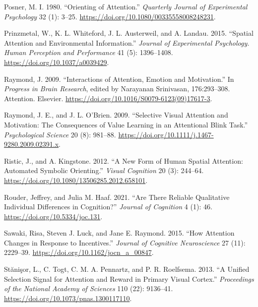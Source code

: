 \documentclass[11pt,halfline,a4paper,]{ouparticle}
\newlength{\cslhangindent}
\newlength{\cslentryspacingunit} %
\newenvironment{CSLReferences}[2] %
 {%
  \setlength{\parindent}{0pt}
  \ifodd #1
  \let\oldpar\par
  \def\par{\hangindent=\cslhangindent\oldpar}
  \fi
  \setlength{\parskip}{#2\cslentryspacingunit}
 }%
 {}
\begin{document}
\begin{CSLReferences}{1}{0}
\leavevmode{}%
Posner, M. I. 1980. {``Orienting of {Attention}.''} \emph{Quarterly Journal of Experimental Psychology} 32 (1): 3--25. \url{https://doi.org/10.1080/00335558008248231}.

\leavevmode{}%
Prinzmetal, W., K. L. Whiteford, J. L. Austerweil, and A. Landau. 2015. {``Spatial Attention and Environmental Information.''} \emph{Journal of Experimental Psychology. Human Perception and Performance} 41 (5): 1396--1408. \url{https://doi.org/10.1037/a0039429}.

\leavevmode{}%
Raymond, J. 2009. {``Interactions of Attention, Emotion and Motivation.''} In \emph{Progress in {Brain Research}}, edited by Narayanan Srinivasan, 176:293--308. Attention. {Elsevier}. \url{https://doi.org/10.1016/S0079-6123(09)17617-3}.

\leavevmode{}%
Raymond, J. E., and J. L. O'Brien. 2009. {``Selective {Visual Attention} and {Motivation}: {The Consequences} of {Value Learning} in an {Attentional Blink Task}.''} \emph{Psychological Science} 20 (8): 981--88. \url{https://doi.org/10.1111/j.1467-9280.2009.02391.x}.

\leavevmode{}%
Ristic, J., and A. Kingstone. 2012. {``A New Form of Human Spatial Attention: {Automated} Symbolic Orienting.''} \emph{Visual Cognition} 20 (3): 244--64. \url{https://doi.org/10.1080/13506285.2012.658101}.

\leavevmode{}%
Rouder, Jeffrey, and Julia M. Haaf. 2021. {``Are {There Reliable Qualitative Individual Differences} in {Cognition}?''} \emph{Journal of Cognition} 4 (1): 46. \url{https://doi.org/10.5334/joc.131}.

\leavevmode{}%
Sawaki, Risa, Steven J. Luck, and Jane E. Raymond. 2015. {``How Attention Changes in Response to Incentives.''} \emph{Journal of Cognitive Neuroscience} 27 (11): 2229--39. \url{https://doi.org/10.1162/jocn_a_00847}.

\leavevmode{}%
Stănişor, L., C. Togt, C. M. A. Pennartz, and P. R. Roelfsema. 2013. {``A Unified Selection Signal for Attention and Reward in Primary Visual Cortex.''} \emph{Proceedings of the National Academy of Sciences} 110 (22): 9136--41. \url{https://doi.org/10.1073/pnas.1300117110}.


\end{CSLReferences}
\end{document}
